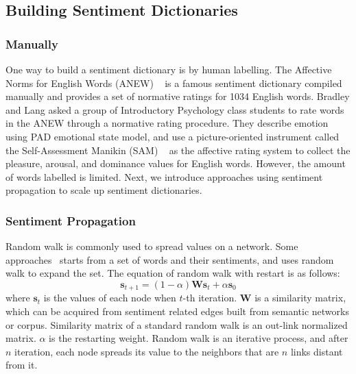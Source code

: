 \subsection{Building Sentiment Dictionaries}
\subsubsection{Manually}
One way to build a sentiment dictionary is by human labelling. The Affective Norms for English Words (ANEW) ~\cite{Bradley:ANEW99} is a famous sentiment dictionary compiled manually and provides a set of normative ratings for 1034 English words. Bradley and Lang asked a group of Introductory Psychology class students to rate words in the ANEW through a normative rating procedure. They describe emotion using PAD emotional state model, and use a picture-oriented instrument called the Self-Assessment Manikin (SAM) ~\cite{Lang:behavioral80} as the affective rating system to collect the pleasure, arousal, and dominance values for English words. However, the amount of words labelled is limited. Next, we introduce approaches using sentiment propagation to scale up sentiment dictionaries.

\subsubsection{Sentiment Propagation}
Random walk is commonly used to spread values on a network. Some approaches~\cite{Wu:relSelect14, Hassan:ACL10, Xu:COLING10, Cambria:AAAI10} starts from a set of words and their sentiments, and uses random walk to expand the set. The equation of random walk with restart is as follows:
\begin{equation}
\label{eq:rndWalk}
\boldsymbol{s}_{t+1} = (1-\alpha)\boldsymbol{W}\boldsymbol{s}_t + \alpha\boldsymbol{s}_0
\end{equation}
where $\boldsymbol{s}_t$ is the values of each node when $t$-th iteration. $\boldsymbol{W}$ is a similarity matrix, which can be acquired from sentiment related edges built from semantic networks or corpus. Similarity matrix of a standard random walk is an out-link normalized matrix. $\alpha$ is the restarting weight. Random walk is an iterative process, and after $n$ iteration, each node spreads its value to the neighbors that are $n$ links distant from it.

